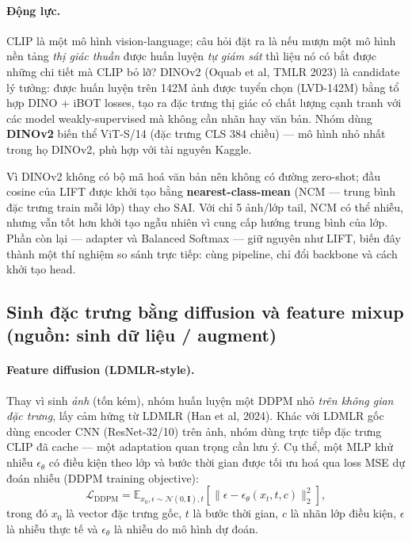 \paragraph{Động lực.}
CLIP là một mô hình vision-language; câu hỏi đặt ra là nếu mượn một mô hình nền tảng \emph{thị giác
thuần} được huấn luyện \emph{tự giám sát} thì liệu nó có bắt được những chi tiết mà CLIP bỏ lỡ?
DINOv2 \cite{oquab2023dinov2} (Oquab et al, TMLR 2023) là candidate lý tưởng: được huấn luyện trên 142M ảnh được
tuyển chọn (LVD-142M) bằng tổ hợp DINO + iBOT losses, tạo ra đặc trưng thị giác có chất lượng
cạnh tranh với các model weakly-supervised mà không cần nhãn hay văn bản. Nhóm dùng
\textbf{DINOv2} biến thể ViT-S/14 (đặc trưng CLS $384$ chiều) --- mô hình nhỏ
nhất trong họ DINOv2, phù hợp với tài nguyên Kaggle.
 
Vì DINOv2 không có bộ mã hoá văn bản nên không có đường zero-shot; đầu cosine của LIFT được khởi tạo
bằng \textbf{nearest-class-mean} (NCM --- trung bình đặc trưng train mỗi lớp) thay cho SAI. Với chỉ
5 ảnh/lớp tail, NCM có thể nhiễu, nhưng vẫn tốt hơn khởi tạo ngẫu nhiên vì cung cấp hướng trung
bình của lớp. Phần còn lại --- adapter và Balanced Softmax --- giữ nguyên như LIFT, biến đây thành
một thí nghiệm so sánh trực tiếp: cùng pipeline, chỉ đổi backbone và cách khởi tạo head.


\subsection{Sinh đặc trưng bằng diffusion và feature mixup (nguồn: sinh dữ liệu / augment)}
\paragraph{Feature diffusion (LDMLR-style).}
Thay vì sinh \emph{ảnh} (tốn kém), nhóm huấn luyện một DDPM nhỏ \emph{trên không gian đặc trưng},
lấy cảm hứng từ LDMLR \cite{han2024ldmlr} (Han et al, 2024). Khác với LDMLR gốc dùng encoder CNN (ResNet-32/10)
trên ảnh, nhóm dùng trực tiếp đặc trưng CLIP đã cache --- một adaptation quan trọng cần lưu ý. Cụ thể, một MLP khử nhiễu $\epsilon_\theta$ có điều kiện theo lớp và bước thời gian được tối ưu hoá
qua loss MSE dự đoán nhiễu (DDPM training objective):
\begin{equation}
    \mathcal{L}_{\text{DDPM}} = \mathbb{E}_{x_0, \epsilon \sim \mathcal{N}(0,\mathbf{I}), t} \left[ \lVert \epsilon - \epsilon_\theta(x_t, t, c) \rVert_2^2 \right],
\end{equation}
trong đó $x_0$ là vector đặc trưng gốc, $t$ là bước thời gian, $c$ là nhãn lớp điều kiện, $\epsilon$ là nhiễu thực tế và $\epsilon_\theta$ là nhiễu do mô hình dự đoán. 
\medskip


